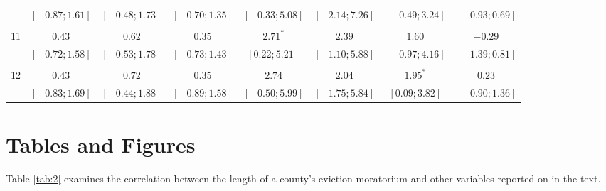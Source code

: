 \documentclass[12pt]{amsart}
\begin{document}
\begin{table}
{\begin{tabular}{l c c c c c c c}
   & $ [-0.87; 1.61]$ & $ [-0.48; 1.73]$ & $ [-0.70; 1.35]$ & $ [-0.33; 5.08]$ & $ [-2.14; 7.26]$ & $ [-0.49; 3.24]$ & $ [-0.93; 0.69]$ \\
   &       &       &       &       &       &       &       \\
11 & $0.43$           & $0.62$           & $0.35$           & $2.71^{*}$       & $2.39$           & $1.60$           & $-0.29$          \\
   & $ [-0.72; 1.58]$ & $ [-0.53; 1.78]$ & $ [-0.73; 1.43]$ & $ [ 0.22; 5.21]$ & $ [-1.10; 5.88]$ & $ [-0.97; 4.16]$ & $ [-1.39; 0.81]$ \\
   &       &       &       &       &       &       &       \\
12 & $0.43$           & $0.72$           & $0.35$           & $2.74$           & $2.04$           & $1.95^{*}$       & $0.23$           \\
   & $ [-0.83; 1.69]$ & $ [-0.44; 1.88]$ & $ [-0.89; 1.58]$ & $ [-0.50; 5.99]$ & $ [-1.75; 5.84]$ & $ [ 0.09; 3.82]$ & $ [-0.90; 1.36]$ \\
\hline\hline
\end{tabular}
}
\label{table:coefficients}
\end{table}

\section{Tables and Figures \label{app:b}}

Table \ref{tab:2} examines the correlation between the length of a county's eviction moratorium and other variables reported on in the text. 
\end{document}
